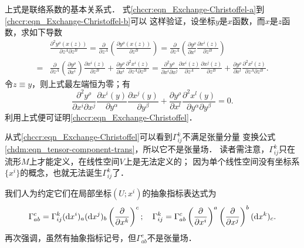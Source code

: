 上式是联络系数的基本关系式．
式\eqref{chccr:eqn_Exchange-Christoffel-a}到\eqref{chccr:eqn_Exchange-Christoffel-b}可以
这样验证，设坐标$y$是$x$函数，而$x$是$z$函数，求如下导数
\begin{align*}
    &\frac{{{\partial ^2}{y^\rho }\left( {x\left( z \right)} \right)}}{{\partial {z^A}\partial {z^B}}}
     = \frac{\partial }{{\partial {z^A}}}\left( {\frac{{\partial {y^\rho }
                \left( {x\left( z \right)} \right)}}{{\partial {z^B}}}} \right)
             = \frac{\partial }{{\partial {z^A}}}\left( {\frac{{\partial {y^\rho }}}
                 {{\partial {x^i}}}\frac{{\partial {x^i}\left( z \right)}}{{\partial {z^B}}}} \right)\\
    =& \frac{\partial }{{\partial {z^A}}}\left( {\frac{{\partial {y^\rho }}}
        {{\partial {x^i}}}} \right)\frac{{\partial {x^i}\left( z \right)}}{{\partial {z^B}}}
    + \frac{{\partial {y^\rho }}}{{\partial {x^i}}}\frac{{{\partial ^2}{x^i}
            \left( z \right)}}{{\partial {z^A}\partial {z^B}}} 
    = \frac{{{\partial ^2}{y^\rho }}}{{\partial {x^i}\partial {x^j}}}
    \frac{{\partial {x^i}\left( z \right)}}{{\partial {z^A}}}
    \frac{{\partial {x^j}\left( z \right)}}{{\partial {z^B}}}
     + \frac{{\partial {y^\rho }}}{{\partial {x^l}}}\frac{{{\partial ^2}{x^l}
             \left( z \right)}}{{\partial {z^A}\partial {z^B}}} .
\end{align*}
令$z\equiv y$，则上式最左端恒为零；有
\begin{equation} \label{chccr:eqn_d2ydx2}
	\frac{{{\partial ^2}{y^\rho }}}{{\partial {x^i}\partial {x^j}}}
		\frac{{\partial {x^i}\left( y \right)}}{{\partial {y^\alpha}}}
		\frac{{\partial {x^j}\left( y \right)}}{{\partial {y^\beta}}}
		+ \frac{{\partial {y^\rho }}}{{\partial {x^l}}}\frac{{{\partial ^2}{x^l}
				\left( y \right)}}{{\partial {y^\alpha}\partial {y^\beta}}} =0.
\end{equation}
利用上式便可证明\eqref{chccr:eqn_Exchange-Christoffel}．

从式\eqref{chccr:eqn_Exchange-Christoffel}可以看到$\Gamma^{k}_{ij}$不满足张量分量
变换公式\eqref{chdm:eqn_tensor-component-trans}，所以它不是张量场．
读者需注意，$\Gamma^{k}_{ij}$只在流形$M$上才能定义，在线性空间$V$上是无法定义的；
因为单个线性空间没有坐标系$\{x^i\}$的概念，也就无法诞生$\Gamma^{k}_{ij}$了．

我们人为约定它们在局部坐标$(U;x^i)$的抽象指标表达式为
\begin{equation}\label{chccr:eqn_Christoffel-naturalbases-ij}
    \Gamma_{ab}^c = \Gamma_{ij}^k ({\rm d}x^i)_a ({\rm d}x^j)_b
    \left(\frac{\partial}{\partial x^k} \right)^c; \quad
    \Gamma_{ij}^k  = \Gamma_{ab}^c  \left(\frac{\partial}{\partial x^i} \right)^a
    \left(\frac{\partial}{\partial x^j} \right)^b ({\rm d}x^k)_c .
\end{equation}
再次强调，虽然有抽象指标记号，但$\Gamma_{ab}^c$不是张量场．

